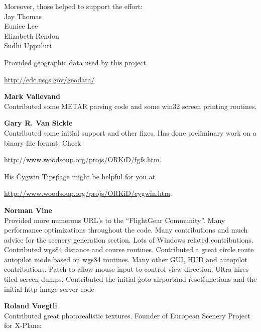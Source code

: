  Moreover, those helped to support the effort:\\
      Jay Thomas\\
      Eunice Lee\\
      Elizabeth Rendon\\
      Sudhi Uppuluri
  \medskip


\noindent
 \textbf{}
  \medskip

  Provided geographic data used by this project.
 \medskip

\href{http://edc.usgs.gov/geodata/}{http://edc.usgs.gov/geodata/}
 \medskip

\noindent \textbf{Mark Vallevand}\\
  Contributed some METAR parsing code and some win32 screen printing routines.
\medskip

\noindent \textbf{Gary R. Van Sickle}\\
  Contributed some initial  support and other fixes. Has done
  preliminary work on a binary file format. Check
  \medskip

 \href{http://www.woodsoup.org/projs/ORKiD/fgfs.htm}{http://www.woodsoup.org/projs/ORKiD/fgfs.htm}.
 \medskip

\noindent
  His \'Cygwin Tips\' page might be helpful for you at
  \medskip



   \href{http://www.woodsoup.org/projs/ORKiD/cygwin.htm}{http://www.woodsoup.org/projs/ORKiD/cygwin.htm}.
  \medskip

\noindent \textbf{Norman Vine}\\
  Provided more numerous URL's to the ``FlightGear Community''.
  Many performance optimizations throughout the code.  Many contributions
  and much advice for the scenery generation section.  Lots of Windows
  related contributions. Contributed wgs84 distance and course routines.
  Contributed a great circle route autopilot mode based on wgs84 routines.
  Many other GUI, HUD and autopilot contributions.  Patch to allow mouse input to control view direction. Ultra hires tiled screen dumps. Contributed the initial \'goto airport\' and \'reset\' functions and the initial http image server code
\medskip

\noindent \textbf{Roland Voegtli}\\
 Contributed great photorealistic textures.   Founder of European Scenery Project for
 X-Plane:
 \medskip

